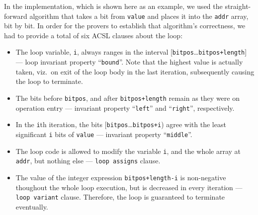 In the implementation, which is shown here as an example, we used
the straight-forward
algorithm that takes a bit from \lstinline{value} and places it into
the \lstinline{addr} array, bit by bit.
%
In order for the provers to establish that algorithm's correctness,
we had to provide a total of six ACSL clauses about the loop:
%
\begin{itemize}
\item The loop variable, \lstinline{i}, always ranges in the interval
	[\lstinline{bitpos}\ldots\lstinline{bitpos+length}] 
	--- loop invariant property ``\lstinline{bound}''.
	Note that the highest value is actually taken,
	viz.\ on exit of the loop body in the last iteration,
	subsequently causing the loop to terminate.
\item The bits before \lstinline{bitpos}, and after
	\lstinline{bitpos+length}
	remain as they were on operation entry --- invariant property
	``\lstinline{left}'' and ``\lstinline{right}'', respectively.
\item In the \lstinline{i}th iteration, the bits
	[\lstinline{bitpos}\ldots\lstinline{bitpos+i}) agree with
	the least significant
	\lstinline{i} bits of \lstinline{value} --- invariant property
	``\lstinline{middle}''.
\item The loop code is allowed to modify the variable \lstinline{i},
	and the whole array
	at \lstinline{addr}, but nothing else --- 
	\lstinline{loop assigns} clause.
\item The value of the integer
	expression \lstinline{bitpos+length-i} is non-negative thoughout
	the whole loop execution, but is decreased in every iteration 
	--- \lstinline{loop variant} clause.
	Therefore, the loop is guaranteed to terminate eventually.
\end{itemize}









